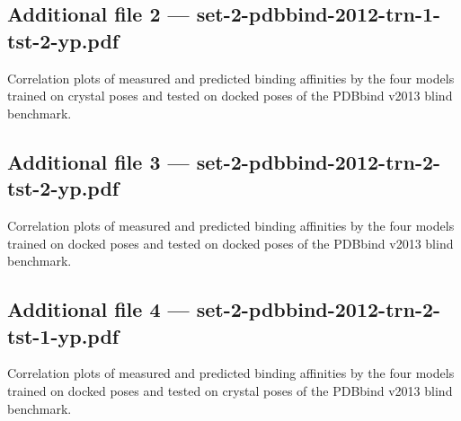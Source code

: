 \documentclass[twocolumn]{bmcart}
\begin{document}
\begin{backmatter}
\subsection*{Additional file 2 --- set-2-pdbbind-2012-trn-1-tst-2-yp.pdf}
Correlation plots of measured and predicted binding affinities by the four models trained on crystal poses and tested on docked poses of the PDBbind v2013 blind benchmark.

\subsection*{Additional file 3 --- set-2-pdbbind-2012-trn-2-tst-2-yp.pdf}
Correlation plots of measured and predicted binding affinities by the four models trained on docked poses and tested on docked poses of the PDBbind v2013 blind benchmark.

\subsection*{Additional file 4 --- set-2-pdbbind-2012-trn-2-tst-1-yp.pdf}
Correlation plots of measured and predicted binding affinities by the four models trained on docked poses and tested on crystal poses of the PDBbind v2013 blind benchmark.




\end{backmatter}
\end{document}
